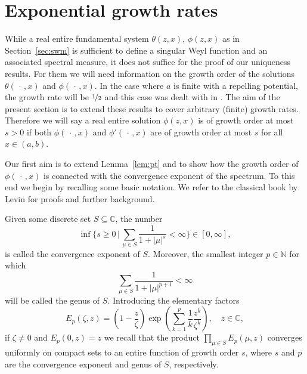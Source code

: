 \documentclass{amsart}
\numberwithin{equation}{section}
\begin{document}
\section{Exponential growth rates}
\label{sec:egr}

While a real entire fundamental system $\theta(z,x)$, $\phi(z,x)$ as in Section~\ref{sec:swm} is sufficient to define a singular
Weyl function and an associated spectral measure, it does not suffice for the proof of our uniqueness results. 
For them we will need information on the growth order of the solutions $\theta(\,\cdot\,,x)$ and $\phi(\,\cdot\,,x)$. In the case
where $a$ is finite with a repelling potential, the growth rate will be $\nicefrac{1}{2}$ and this case was dealt
with in \cite[Section~6]{kst2}. The aim of the present section is to extend these results to cover arbitrary (finite) growth rates.
 Therefore we will say a real entire solution $\phi(z,x)$ is of growth order at most $s>0$ if both $\phi(\,\cdot\,,x)$ and $\phi'(\,\cdot\,,x)$
are of growth order at most $s$ for all $x\in(a,b)$.

Our first aim is to extend Lemma~\ref{lem:pt} and to show how the growth order of $\phi(\,\cdot\,,x)$ is connected with the convergence exponent
of the spectrum. To this end we begin by recalling some basic notation. We refer to the classical book by Levin \cite{lev} for proofs and further
background.

Given some discrete set $S\subseteq{{\mathbb C}}$, the number
\begin{equation}
 \inf\biggr\lbrace s\geq0 \,\biggr|\, \sum_{\mu\in S} \frac{1}{1+|\mu|^s}<\infty \biggr\rbrace \in [0,\infty],
\end{equation}
is called the convergence exponent of $S$. Moreover, the smallest integer $p\in{{\mathbb N}}$ for which
\begin{equation}
 \sum_{\mu\in S} \frac{1}{1+|\mu|^{p+1}}<\infty
\end{equation}
will be called the genus of $S$. Introducing the elementary factors
\begin{equation}
 E_p(\zeta,z) = \left(1-\frac{z}{\zeta}\right) \exp\left(\sum_{k=1}^p\frac{1}{k} \frac{z^k}{\zeta^k}\right), \quad z\in{{\mathbb C}},
\end{equation}
if $\zeta\not=0$ and $E_p(0,z)=z$ we recall that the product $\prod_{\mu\in S} E_p(\mu,z)$
converges uniformly on compact sets to an entire function of growth order $s$, where $s$ and $p$ are the
convergence exponent and genus of $S$, respectively.
\end{document}
